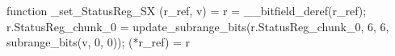 function _set_StatusReg_SX (r_ref, v) = {
    r = __bitfield_deref(r_ref);
    r.StatusReg_chunk_0 = update_subrange_bits(r.StatusReg_chunk_0, 6, 6, subrange_bits(v, 0, 0));
    (*r_ref) = r
}
